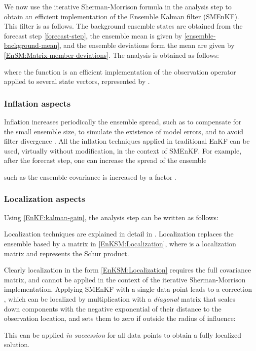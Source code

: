 \documentclass[12pt]{article}
\begin{document}
We now use the iterative Sherman-Morrison formula in the analysis step to obtain
an efficient implementation of the Ensemble Kalman filter (SMEnKF). This filter is as follows.
The background ensemble states  are obtained from the forecast step \eqref{forecast-step},
the ensemble mean  is given by \eqref{ensemble-background-mean}, and the ensemble deviations
form the mean  are given by \eqref{EnSM:Matrix-member-deviations}. 
The analysis is obtained as follows:

where the function  is an efficient implementation of the observation operator
applied to several state vectors, represented by . 

\subsubsection{Inflation aspects}
Inflation increases periodically the ensemble spread, such as to compensate for the small ensemble size, to
simulate the existence of model errors, and to avoid filter divergence \cite{LiHong2009}.	
All the inflation techniques applied in traditional EnKF can be used, virtually without modification, 	
in the context of SMEnKF. For example, after the forecast step, one can increase the spread of the ensemble

such as the ensemble covariance  is increased by a factor   \cite{WuZheng2011}. 

\subsubsection{Localization aspects}
Using \eqref{EnKF:kalman-gain}, the analysis step can be written as follows:

Localization techniques are explained in detail in \cite{Anderson200799}.
Localization replaces the ensemble based  by a matrix  in \eqref{EnKSM:Localization}, where  is a localization matrix and 
  represents the Schur product. 
 
Clearly  localization in the form \eqref{EnKSM:Localization} requires the full covariance matrix, and cannot be applied in the context of the iterative Sherman-Morrison implementation. 
Applying SMEnKF with a single data point  leads to a correction , which can be localized
by multiplication with a {\em diagonal} matrix  that scales down components with the negative exponential of their distance to the observation  location, and sets them to zero if outside the radius of influence:

This can be applied {\em in succession} for all data points to obtain a fully localized solution.
\end{document}
